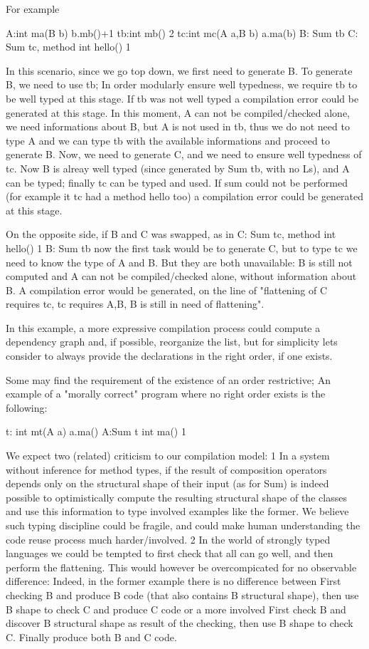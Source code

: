\documentclass{llncs}
\begin{document}
For example

A:{int ma(B b) b.mb()+1}
tb:{int mb() 2}
tc:{int mc(A a,B b) a.ma(b)}
B: Sum tb
C: Sum tc, {method int hello() 1}

In this scenario, since we go top down, we first need to generate B.
To generate B, we need to use tb;
In order modularly ensure well typedness,
we require tb to be well typed at this stage. If tb was not well typed
a compilation error could be generated at this stage.
In this moment, A can not be compiled/checked alone,
we need informations about B, but A is not used in tb,
thus we do not need to type A and we can type tb with
 the available informations and proceed to generate B.
Now, we need to generate C, and we need to ensure well typedness of tc.
Now B is alreay well typed (since generated by Sum tb, with no Ls),
and A can be typed;  finally tc can be typed and used.
If sum could not be performed (for example it tc had a method hello too)
a compilation error could be generated at this stage.

On the opposite side, if B and C was swapped, as in
C: Sum tc, {method int hello() 1}  
B: Sum tb
now the first task would be to generate C, but 
to type tc we need to know the type of A and B.
But they are both unavailable: B is still not computed and 
A can not be compiled/checked alone, without information about B.
A compilation error would be generated, on the line of "flattening of C
requires tc, tc requires A,B, B is still in need of flattening".

In this example, a more expressive compilation process 
could compute a dependency graph and, if possible, reorganize the list,
but for simplicity lets consider to always provide the declarations
in the right order, if one exists.

Some may find the requirement of the existence of an order restrictive;
An example of a "morally correct" program where no right order exists is the following:

t:{ int mt(A a) a.ma()}
A:Sum t {int ma() 1}

We expect two (related) criticism to our compilation model:
1
In a system without inference for method types,
if the result of composition operators depends only on the
structural shape of their input (as for Sum)
is indeed possible to optimistically compute the resulting structural shape of the classes
and use this information to type involved examples like the former.
We believe such typing discipline could be fragile,
and could make human understanding the code reuse process much harder/involved.
2
In the world of strongly typed languages we could be tempted to
first check that all can go well, and then perform the flattening.
This would however be overcompicated for no observable difference:
Indeed, in the former example there is no difference
between
  First checking B and produce B code (that also contains B structural shape),
  then use B shape to check C and produce C code
or a more involved
  First check B and discover B structural shape as result of the checking,
  then use B shape to check C.
  Finally produce both B and C code.
\end{document}
